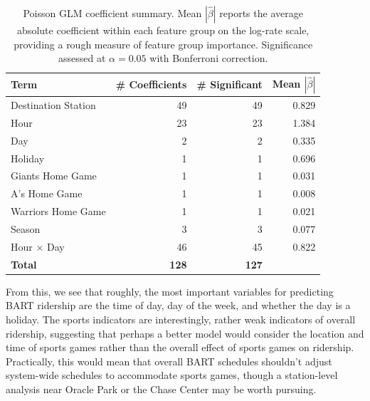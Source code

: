 \documentclass[11pt, letterpaper]{article}
\begin{document}
\begin{table}[h]
\centering
\begin{tabular}{lrrr}
\hline
\textbf{Term} & \textbf{\# Coefficients} & \textbf{\# Significant} & \textbf{Mean $|\hat{\beta}|$} \\
\hline
Destination Station        & 49  & 49  & 0.829 \\
Hour                       & 23  & 23  & 1.384 \\
Day                        & 2   & 2   & 0.335 \\
Holiday                    & 1   & 1   & 0.696 \\
Giants Home Game           & 1   & 1   & 0.031 \\
A's Home Game              & 1   & 1   & 0.008 \\
Warriors Home Game         & 1   & 1   & 0.021 \\
Season                     & 3   & 3   & 0.077 \\
Hour $\times$ Day          & 46  & 45  & 0.822 \\
\hline
\textbf{Total}             & \textbf{128} & \textbf{127} & \\
\hline
\end{tabular}
\caption{Poisson GLM coefficient summary. Mean $|\hat{\beta}|$ reports the average absolute
coefficient within each feature group on the log-rate scale, providing a rough measure
of feature group importance. Significance assessed at $\alpha = 0.05$ with Bonferroni correction.}
\label{tab:poisson_coefficients}
\end{table}

From this, we see that roughly, the most important variables for predicting BART ridership are the time of day, day of the week, and whether the day is a holiday. The sports indicators are interestingly, rather weak indicators of overall ridership, suggesting that perhaps a better model would consider the location and time of sports games rather than the overall effect of sports games on ridership. Practically, this would mean that overall BART schedules shouldn't adjust system-wide schedules to accommodate sports games, though a station-level analysis near Oracle Park or the Chase Center may be worth pursuing. 


\end{document}
